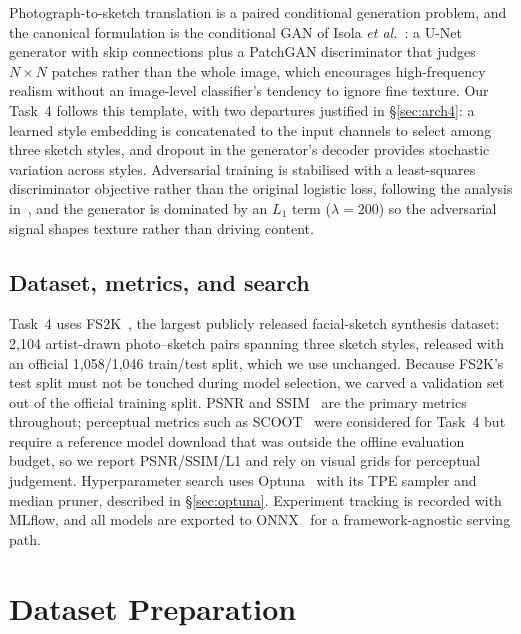 \documentclass[journal]{IEEEtran}
\begin{document}
Photograph-to-sketch translation is a paired conditional generation problem, and the canonical formulation is the conditional GAN of Isola \emph{et al.}~\cite{isola2017pix2pix}: a U-Net generator with skip connections plus a PatchGAN discriminator that judges $N\times N$ patches rather than the whole image, which encourages high-frequency realism without an image-level classifier's tendency to ignore fine texture. Our Task~4 follows this template, with two departures justified in \S\ref{sec:arch4}: a learned style embedding is concatenated to the input channels to select among three sketch styles, and dropout in the generator's decoder provides stochastic variation across styles. Adversarial training is stabilised with a least-squares discriminator objective rather than the original logistic loss, following the analysis in~\cite{mao2017least}, and the generator is dominated by an $L_1$ term ($\lambda=200$) so the adversarial signal shapes texture rather than driving content.

\subsection{Dataset, metrics, and search}

Task~4 uses FS2K~\cite{fan2022fs2k}, the largest publicly released facial-sketch synthesis dataset: 2{,}104 artist-drawn photo--sketch pairs spanning three sketch styles, released with an official 1{,}058/1{,}046 train/test split, which we use unchanged. Because FS2K's test split must not be touched during model selection, we carved a validation set out of the official training split. PSNR and SSIM~\cite{wang2004image} are the primary metrics throughout; perceptual metrics such as SCOOT~\cite{fan2019scoot} were considered for Task~4 but require a reference model download that was outside the offline evaluation budget, so we report PSNR/SSIM/L1 and rely on visual grids for perceptual judgement. Hyperparameter search uses Optuna~\cite{akiba2019optuna} with its TPE sampler and median pruner, described in \S\ref{sec:optuna}. Experiment tracking is recorded with MLflow, and all models are exported to ONNX~\cite{onnx} for a framework-agnostic serving path.

\section{Dataset Preparation}
\label{sec:data}
\end{document}
